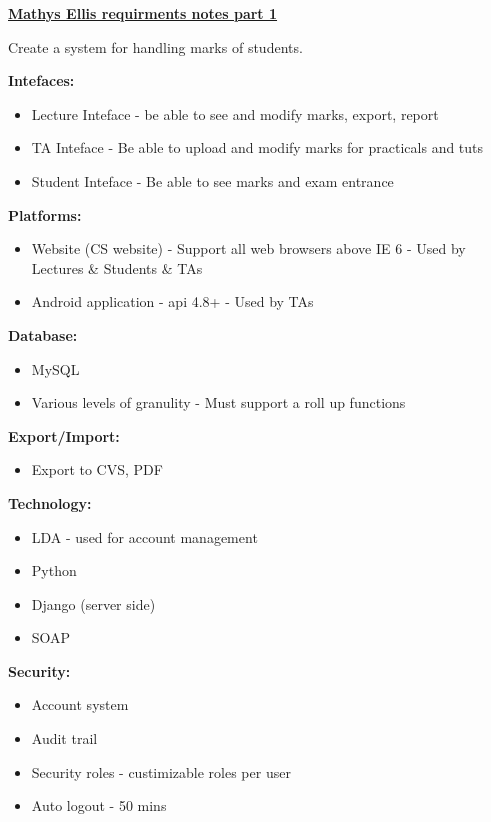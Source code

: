 \documentclass{article}
\begin{document}
\textbf{\underline{Mathys Ellis requirments notes part 1}}

Create a system for handling marks of students.

\textbf{Intefaces:}
\begin{itemize}
\item Lecture Inteface - be able to see and modify marks, export, report
\item TA Inteface - Be able to upload and modify marks for practicals and tuts
\item Student Inteface - Be able to see marks and exam entrance
\end{itemize}

\textbf{Platforms:}
\begin{itemize}
\item Website (CS website) - Support all web browsers above IE 6 - Used by Lectures \& Students \& TAs
\item Android application - api 4.8+ - Used by TAs
\end{itemize}

\textbf{Database:}
\begin{itemize}
\item MySQL
\item Various levels of granulity - Must support a roll up functions
\end{itemize}

\textbf{Export/Import:}
\begin{itemize}
\item Export to CVS, PDF
\end{itemize}

\textbf{Technology:}
\begin{itemize}
\item LDA - used for account management
\item Python
\item Django (server side)
\item SOAP
\end{itemize}

\textbf{Security:}
\begin{itemize}
\item Account system
\item Audit trail
\item Security roles - custimizable roles per user
\item Auto logout - 50 mins
\end{itemize}
\end{document}
